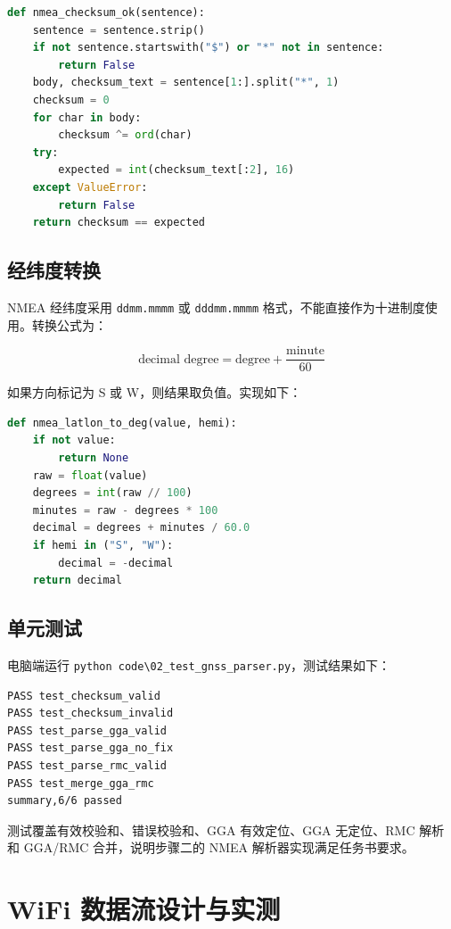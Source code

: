 \documentclass[UTF8,a4paper,12pt]{ctexart}
\begin{document}
\begin{lstlisting}[language=Python]
def nmea_checksum_ok(sentence):
    sentence = sentence.strip()
    if not sentence.startswith("$") or "*" not in sentence:
        return False
    body, checksum_text = sentence[1:].split("*", 1)
    checksum = 0
    for char in body:
        checksum ^= ord(char)
    try:
        expected = int(checksum_text[:2], 16)
    except ValueError:
        return False
    return checksum == expected
\end{lstlisting}

\subsection{经纬度转换}
NMEA 经纬度采用 \verb|ddmm.mmmm| 或 \verb|dddmm.mmmm| 格式，不能直接作为十进制度使用。转换公式为：

\begin{equation}
\text{decimal degree} = \text{degree} + \frac{\text{minute}}{60}
\end{equation}

如果方向标记为 S 或 W，则结果取负值。实现如下：

\begin{lstlisting}[language=Python]
def nmea_latlon_to_deg(value, hemi):
    if not value:
        return None
    raw = float(value)
    degrees = int(raw // 100)
    minutes = raw - degrees * 100
    decimal = degrees + minutes / 60.0
    if hemi in ("S", "W"):
        decimal = -decimal
    return decimal
\end{lstlisting}

\subsection{单元测试}
电脑端运行 \verb|python code\02_test_gnss_parser.py|，测试结果如下：

\begin{lstlisting}
PASS test_checksum_valid
PASS test_checksum_invalid
PASS test_parse_gga_valid
PASS test_parse_gga_no_fix
PASS test_parse_rmc_valid
PASS test_merge_gga_rmc
summary,6/6 passed
\end{lstlisting}

测试覆盖有效校验和、错误校验和、GGA 有效定位、GGA 无定位、RMC 解析和 GGA/RMC 合并，说明步骤二的 NMEA 解析器实现满足任务书要求。

\clearpage
\section{WiFi 数据流设计与实测}
\end{document}
